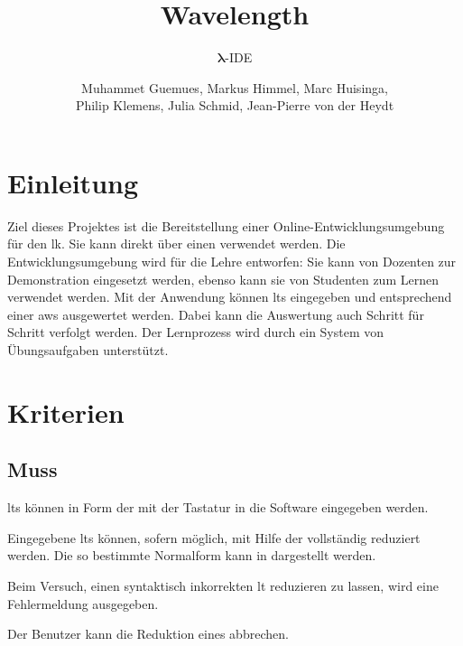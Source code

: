 \documentclass[parskip=full,11pt,twoside]{scrartcl}
\title{Wavelength}
\subtitle{$\bm{\lambda}$-IDE}
\author{Muhammet Guemues, Markus Himmel, Marc Huisinga,\\Philip Klemens, Julia Schmid, Jean-Pierre von der Heydt}
\begin{document}
\maketitle
\thispagestyle{empty}
\pagebreak

\tableofcontents
\pagebreak

\section{Einleitung}
Ziel dieses Projektes ist die Bereitstellung einer Online-Entwicklungsumgebung für den \gls{lk}. 
Sie kann direkt über einen  verwendet werden.
Die Entwicklungsumgebung wird für die Lehre entworfen: 
Sie kann von Dozenten zur Demonstration eingesetzt werden, ebenso kann sie von Studenten zum Lernen verwendet werden.
Mit der Anwendung können \glspl{lt} eingegeben und entsprechend einer \gls{aws} ausgewertet werden.
Dabei kann die Auswertung auch Schritt für Schritt verfolgt werden.
Der Lernprozess wird durch ein System von Übungsaufgaben unterstützt.

\pagebreak
\section{Kriterien}

\subsection{Muss}

\glspl{lt} können in Form der 
mit der Tastatur in die Software eingegeben werden.

Eingegebene \glspl{lt} können, sofern möglich, mit Hilfe der  vollständig
reduziert werden. Die so bestimmte Normalform kann in 
dargestellt werden.

Beim Versuch, einen syntaktisch inkorrekten \gls{lt} reduzieren zu lassen, wird eine
Fehlermeldung ausgegeben.

Der Benutzer kann die Reduktion eines  abbrechen.
\end{document}
